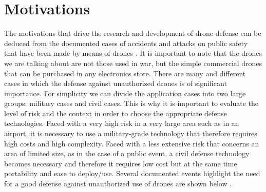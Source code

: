 \section{Motivations}
The motivations that drive the research and development of drone defense can be deduced from the documented cases of accidents and attacks on public safety that have been made by means of drones \cite{survey} \cite{uspace}. It is important to note that the drones we are talking about are not those used in war, but the simple commercial drones that can be purchased in any electronics store. There are many and different cases in which the defense against unauthorized drones is of significant importance. For simplicity we can divide the application cases into two large groups: military cases and civil cases. This is why it is important to evaluate the level of risk and the context in order to choose the appropriate defense technologies. Faced with a very high risk in a very large area such as in an airport, it is necessary to use a military-grade technology that therefore requires high costs and high complexity. Faced with a less extensive risk that concerns an area of limited size, as in the case of a public event, a civil defense technology becomes necessary and therefore it requires low cost but at the same time portability and ease to deploy/use. Several documented events highlight the need for a good defense against unauthorized use of drones are shown below \cite{survey}.
